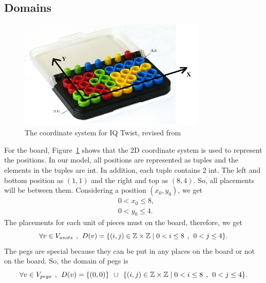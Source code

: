 \subsection{Domains}
\begin{figure}[htbp]
\centering
\includegraphics[width=0.8\textwidth]{figs/IQtwistboard.jpg}
\caption{The coordinate system for IQ Twist, revised from~\cite{r22}}
    \label{fig:coordinate}
\end{figure}
For the board, Figure~\ref{fig:coordinate} shows that the 2D coordinate system is used to represent the positions. In our model, all positions are represented as tuples and the elements in the tuples are int. In addition, each tuple contains 2 int. The left and bottom position as $(1,1)$ and the right and top as $(8,4)$. So, all placements will be between them. Considering a position $(x_{0},y_{0})$, we get
\begin{equation}
\begin{aligned}
&0<x_{0} \leq 8,\\
&0<y_{0} \leq 4.
\end{aligned}
\end{equation}
The placements for each unit of pieces must on the board, therefore, we get
\begin{equation}
\forall  v \in V_{units} \hspace{1ex},\hspace{1ex} D(v)=\{(i,j) \in \mathbb{Z} \times \mathbb{Z}	\mid  0<i \leq 8 \hspace{1ex} , \hspace{1ex} 0<j \leq 4\}.\\
\end{equation}
The pegs are special because they can be put in any places on the board or not on the board. So, the domain of pegs is
\begin{equation}
\forall  v \in V_{pegs} \hspace{1ex},\hspace{1ex} D(v)=\{(0,0)\} \hspace{1ex} \cup \hspace{1ex}\{(i,j) \in \mathbb{Z} \times \mathbb{Z}\mid  0<i \leq 8 \hspace{1ex} , \hspace{1ex} 0<j \leq 4\}.
\end{equation}
